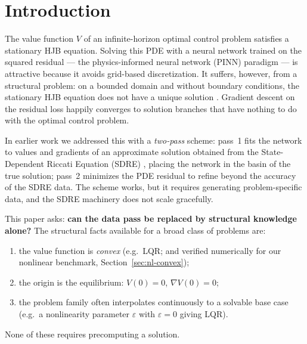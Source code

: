 \documentclass[11pt,a4paper]{article}
\begin{document}
\section{Introduction}

The value function $V$ of an infinite-horizon optimal control problem
satisfies a stationary HJB equation. Solving this PDE with a neural network
trained on the squared residual --- the physics-informed neural network
(PINN) paradigm \cite{raissi2019physics} --- is attractive because it avoids
grid-based discretization. It suffers, however, from a structural problem:
on a bounded domain and without boundary conditions, the stationary HJB
equation does not have a unique solution \cite{bardi1997optimal}. Gradient
descent on the residual
loss happily converges to solution branches that have nothing to do with the
optimal control problem.

In earlier work \cite{borovykh2022data} we addressed this with a
\emph{two-pass} scheme: pass~1 fits the network to values and gradients of
an approximate solution obtained from the State-Dependent Riccati Equation
(SDRE) \cite{banks2007nonlinear}, placing the network in the basin of the
true solution; pass~2 minimizes the PDE residual to refine beyond the
accuracy of the SDRE data. The scheme works, but it requires generating
problem-specific data, and the SDRE machinery does not scale gracefully.

This paper asks: \textbf{can the data pass be replaced by structural
knowledge alone?} The structural facts available for a broad class of
problems are:
\begin{enumerate}[itemsep=1pt]
  \item the value function is \emph{convex} (e.g.\ LQR; and verified
        numerically for our nonlinear benchmark, Section~\ref{sec:nl-convex});
  \item the origin is the equilibrium: $V(0)=0$, $\nabla V(0)=0$;
  \item the problem family often interpolates continuously to a solvable
        base case (e.g.\ a nonlinearity parameter $\varepsilon$ with
        $\varepsilon=0$ giving LQR).
\end{enumerate}
None of these requires precomputing a solution.
\end{document}
